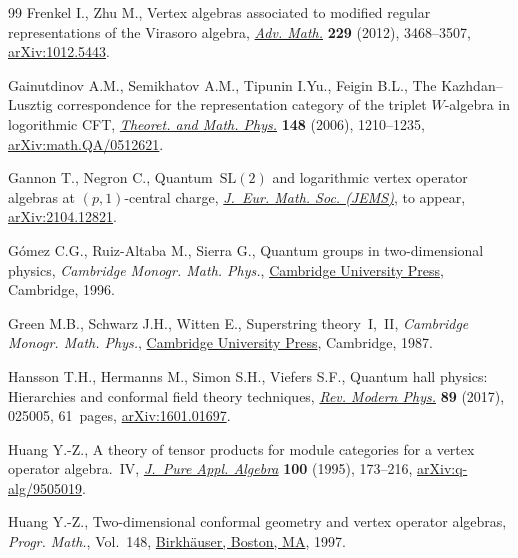 \documentclass[pdftex]{sigma}
\numberwithin{equation}{section}
\begin{document}
\begin{thebibliography}{99}
Frenkel I., Zhu M., Vertex algebras associated to modified regular
 representations of the {V}irasoro algebra,
 \href{https://doi.org/10.1016/j.aim.2012.02.008}{\textit{Adv. Math.}}
 \textbf{229} (2012), 3468--3507,
 \href{http://arxiv.org/abs/1012.5443}{arXiv:1012.5443}.

Gainutdinov A.M., Semikhatov A.M., Tipunin I.Yu., Feigin B.L., The
 {K}azhdan--{L}usztig correspondence for the representation category of the
 triplet {$W$}-algebra in logorithmic {CFT},
 \href{https://doi.org/10.1007/s11232-006-0113-6}{\textit{Theoret. and Math.
 Phys.}} \textbf{148} (2006), 1210--1235,
 \href{http://arxiv.org/abs/math.QA/0512621}{arXiv:math.QA/0512621}.

Gannon T., Negron C., Quantum~$\mathrm{SL}(2)$ and logarithmic vertex operator
 algebras at $(p,1)$-central charge,
 \href{https://doi.org/10.4171/JEMS/1489}{\textit{J.~Eur. Math. Soc. (JEMS)}},
{t}o appear,
 \href{http://arxiv.org/abs/2104.12821}{arXiv:2104.12821}.

G\'omez C.G., Ruiz-Altaba M., Sierra G., Quantum groups in two-dimensional
 physics, \textit{Cambridge Monogr. Math. Phys.},
 \href{https://doi.org/10.1017/CBO9780511628825}{Cambridge University Press}, Cambridge,
 1996.

Green M.B., Schwarz J.H., Witten E., Superstring theory~I,~II, \textit{Cambridge
 Monogr. Math. Phys.}, \href{https://doi.org/10.1002/asna.2113090428}{Cambridge
 University Press}, Cambridge, 1987.

Hansson T.H., Hermanns M., Simon S.H., Viefers S.F., Quantum hall physics: {H}ierarchies and conformal field theory techniques,
 \href{https://doi.org/10.1103/RevModPhys.89.025005}{\textit{Rev. Modern
 Phys.}} \textbf{89} (2017), 025005, 61~pages,
 \href{http://arxiv.org/abs/1601.01697}{arXiv:1601.01697}.

Huang Y.-Z., A theory of tensor products for module categories for a vertex
 operator algebra.~{IV},
 \href{https://doi.org/10.1016/0022-4049(95)00050-7}{\textit{J.~Pure Appl.
 Algebra}} \textbf{100} (1995), 173--216,
 \href{http://arxiv.org/abs/q-alg/9505019}{arXiv:q-alg/9505019}.

Huang Y.-Z., Two-dimensional conformal geometry and vertex operator algebras,
 \textit{Progr. Math.}, Vol.~148,
 \href{https://doi.org/10.1007/978-1-4612-4276-5}{Birkh\"auser, Boston, MA},
 1997.


\end{thebibliography}
\end{document}
